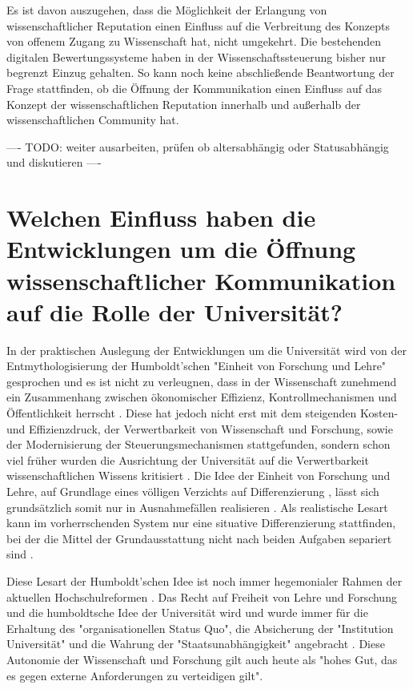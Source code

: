 Es ist davon auszugehen, dass die Möglichkeit der Erlangung von wissenschaftlicher Reputation einen Einfluss auf die Verbreitung des Konzepts von offenem Zugang zu Wissenschaft hat, nicht umgekehrt. Die bestehenden digitalen Bewertungssysteme haben in der Wissenschaftssteuerung bisher nur begrenzt Einzug gehalten. So kann noch keine abschließende Beantwortung der Frage stattfinden, ob die Öffnung der Kommunikation einen Einfluss auf das Konzept der wissenschaftlichen Reputation innerhalb und außerhalb der wissenschaftlichen Community hat.

---- TODO: weiter ausarbeiten, prüfen ob altersabhängig oder Statusabhängig und diskutieren ----

\section{Welchen Einfluss haben die Entwicklungen um die Öffnung wissenschaftlicher Kommunikation auf die Rolle der Universität?}

In der praktischen Auslegung der Entwicklungen um die Universität wird von der Entmythologisierung der Humboldt’schen "Einheit von Forschung und Lehre" gesprochen \cite{binswanger_2014_excellence} \cite[:299]{Schimank_2001} \cite[:343]{Kruecken_2001} und es ist nicht zu verleugnen, dass in der Wissenschaft zunehmend ein Zusammenhang zwischen ökonomischer Effizienz, Kontrollmechanismen und Öffentlichkeit herrscht \cite[:27]{Reinhart_intransparenz_2006} \cite{foucault_1977_uberwachen}. Diese hat jedoch nicht erst mit dem steigenden Kosten- und Effizienzdruck, der Verwertbarkeit von Wissenschaft und Forschung, sowie der Modernisierung der Steuerungsmechanismen stattgefunden, sondern schon viel früher wurden die Ausrichtung der Universität auf die Verwertbarkeit wissenschaftlichen Wissens kritisiert \cite{Huber_2005}. Die Idee der Einheit von Forschung und Lehre, auf Grundlage eines völligen Verzichts auf Differenzierung \cite{kittler_2004}, lässt sich grundsätzlich somit nur in Ausnahmefällen realisieren \cite{Schimank_2001}. Als realistische Lesart kann im vorherrschenden System nur eine situative Differenzierung stattfinden, bei der die Mittel der Grundausstattung nicht nach beiden Aufgaben separiert sind \cite{Schimank_2001}.

Diese Lesart der Humboldt’schen Idee ist noch immer hegemonialer Rahmen der aktuellen Hochschulreformen \cite{Huber_2005}. Das Recht auf Freiheit von Lehre und Forschung und die humboldtsche Idee der Universität wird und wurde immer für die Erhaltung des "organisationellen Status Quo", die Absicherung der "Institution Universität" und die Wahrung der "Staatsunabhängigkeit" angebracht \cite{Huber_2005}. Diese Autonomie der Wissenschaft und Forschung gilt auch heute als "hohes Gut, das es gegen externe Anforderungen zu verteidigen gilt"\cite{kaldewey_2010}.


